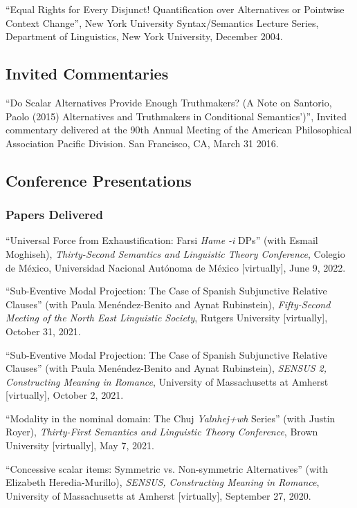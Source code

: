 \documentclass[11pt]{article}
\begin{document}
``Equal Rights for Every Disjunct! Quantification over Alternatives or Pointwise Context Change'', New York University Syntax/Semantics Lecture Series, Department of Linguistics, New York University, December 2004.


\subsection*{Invited Commentaries}

``Do Scalar Alternatives Provide Enough Truthmakers? (A Note on Santorio, Paolo (2015) Alternatives and Truthmakers in Conditional Semantics')'', Invited commentary delivered at the 90th Annual Meeting of the American Philosophical Association Pacific Division. San Francisco, CA, March 31 2016. 


\subsection*{Conference Presentations}


\subsubsection*{Papers Delivered}

``Universal Force from Exhaustification:
Farsi \textit{Hame} \textit{-i} DPs'' (with Esmail Moghiseh), \textit{Thirty-Second Semantics and Linguistic Theory Conference}, Colegio de M\'exico, Universidad Nacional Aut\'onoma de M\'exico [virtually], June 9, 2022.

``Sub-Eventive Modal Projection:
The Case of Spanish Subjunctive Relative Clauses'' (with Paula Men\'endez-Benito and Aynat Rubinstein), \textit{Fifty-Second Meeting of the North East Linguistic Society}, Rutgers University [virtually], October 31, 2021.


``Sub-Eventive Modal Projection:
The Case of Spanish Subjunctive Relative Clauses'' (with Paula Men\'endez-Benito and Aynat Rubinstein), \textit{SENSUS 2, Constructing Meaning in Romance}, University of Massachusetts at Amherst [virtually], October 2, 2021.

``Modality in the nominal domain: The Chuj \textit{Yalnhej+wh} Series'' (with Justin Royer), \textit{Thirty-First Semantics and Linguistic Theory Conference}, Brown University [virtually], May 7, 2021.

``Concessive scalar items: Symmetric vs. Non-symmetric Alternatives'' (with Elizabeth Heredia-Murillo), \textit{SENSUS, Constructing Meaning in Romance}, University of Massachusetts at Amherst [virtually], September 27, 2020.
\end{document}
